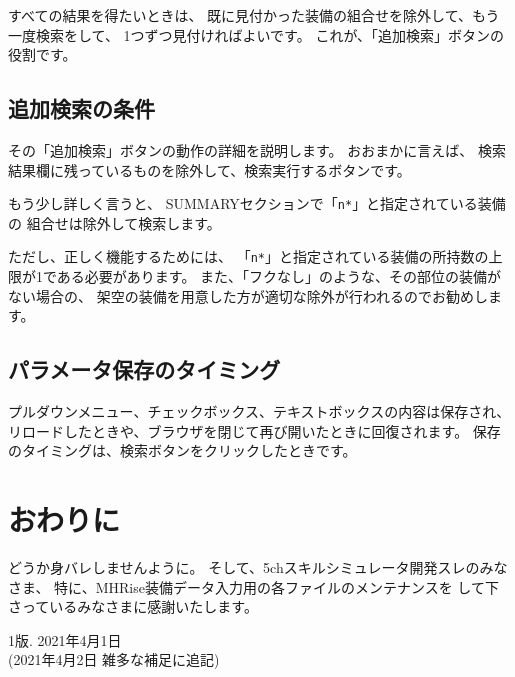\documentclass[dvipdfmx]{jsarticle}
\begin{document}
すべての結果を得たいときは、
既に見付かった装備の組合せを除外して、もう一度検索をして、
1つずつ見付ければよいです。
これが、「追加検索」ボタンの役割です。

\subsection{追加検索の条件}
その「追加検索」ボタンの動作の詳細を説明します。
おおまかに言えば、
検索結果欄に残っているものを除外して、検索実行するボタンです。

もう少し詳しく言うと、
SUMMARYセクションで「\texttt{n*}」と指定されている装備の
組合せは除外して検索します。

ただし、正しく機能するためには、
「\texttt{n*}」と指定されている装備の所持数の上限が1である必要があります。
また、「フクなし」のような、その部位の装備がない場合の、
架空の装備を用意した方が適切な除外が行われるのでお勧めします。

\subsection{パラメータ保存のタイミング}
プルダウンメニュー、チェックボックス、テキストボックスの内容は保存され、
リロードしたときや、ブラウザを閉じて再び開いたときに回復されます。
保存のタイミングは、検索ボタンをクリックしたときです。

\section{おわりに} %
どうか身バレしませんように。
そして、5chスキルシミュレータ開発スレのみなさま、
特に、MHRise装備データ入力用の各ファイルのメンテナンスを
して下さっているみなさまに感謝いたします。

\bigskip

\noindent
1版. 2021年4月1日\\
\quad (2021年4月2日 雑多な補足に追記)
\end{document}
